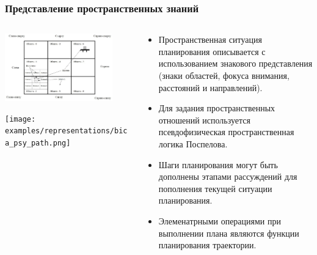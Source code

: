 \documentclass[default]{beamer}
\begin{document}
	\begin{frame}
		\frametitle{Представление пространственных знаний}
		\scriptsize
		\begin{columns}
			\begin{column}{0.5\textwidth}
				\centering
				\includegraphics[width=0.85\textwidth]{behplan.png}
				
				\texttt{[image: examples/representations/bica\_psy\_path.png]}
			\end{column}
			\begin{column}{0.5\textwidth}
				\begin{itemize}
					\item Пространственная ситуация планирования описывается с использованием знакового представления (знаки областей, фокуса внимания, расстояний и направлений).
					\item Для задания пространственных отношений используется псевдофизическая пространственная логика Поспелова.
					\item Шаги планирования могут быть дополнены этапами рассуждений для пополнения текущей ситуации планирования.
					\item Элеменатрными операциями при выполнении плана являются функции планирования траектории.
				\end{itemize}
			\end{column}
		\end{columns}
	
		\nocite{*}
		\printbibliography[keyword={behplanrus}, resetnumbers=true]
	\end{frame}
\end{document}
